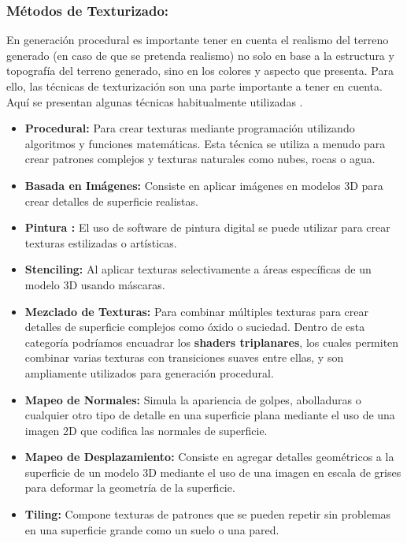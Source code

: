             \subsubsection{Métodos de Texturizado: }
            En generación procedural es importante tener en cuenta el realismo del terreno generado (en caso de que se pretenda realismo) no solo en base a la estructura y topografía del terreno generado, sino en los colores y aspecto que presenta. Para ello, las técnicas de texturización son una parte importante a tener en cuenta. Aquí se presentan algunas técnicas habitualmente utilizadas \cite{texturing2024}.
                \begin{itemize}
                    \item \textbf{Procedural: }Para crear texturas mediante programación utilizando algoritmos y funciones matemáticas. Esta técnica se utiliza a menudo para crear patrones complejos y texturas naturales como nubes, rocas o agua.
                    \item \textbf{Basada en Imágenes: } Consiste en aplicar imágenes en modelos 3D para crear detalles de superficie realistas.
                    \item \textbf{Pintura : } El uso de software de pintura digital se puede utilizar para crear texturas estilizadas o artísticas. 
                    \item \textbf{Stenciling: } Al aplicar texturas selectivamente a áreas específicas de un modelo 3D usando máscaras.
                    \item \textbf{Mezclado de Texturas: }Para combinar múltiples texturas para crear detalles de superficie complejos como óxido o suciedad. Dentro de esta categoría podríamos encuadrar los \textbf{shaders triplanares}, los cuales permiten combinar varias texturas con transiciones suaves entre ellas, y son ampliamente utilizados para generación procedural. 
                    \item \textbf{Mapeo de Normales: }Simula la apariencia de golpes, abolladuras o cualquier otro tipo de detalle en una superficie plana mediante el uso de una imagen 2D que codifica las normales de superficie.
                    \item \textbf{Mapeo de Desplazamiento: }Consiste en agregar detalles geométricos a la superficie de un modelo 3D mediante el uso de una imagen en escala de grises para deformar la geometría de la superficie.
                    \item \textbf{Tiling: }Compone texturas de patrones que se pueden repetir sin problemas en una superficie grande como un suelo o una pared.
                \end{itemize}



